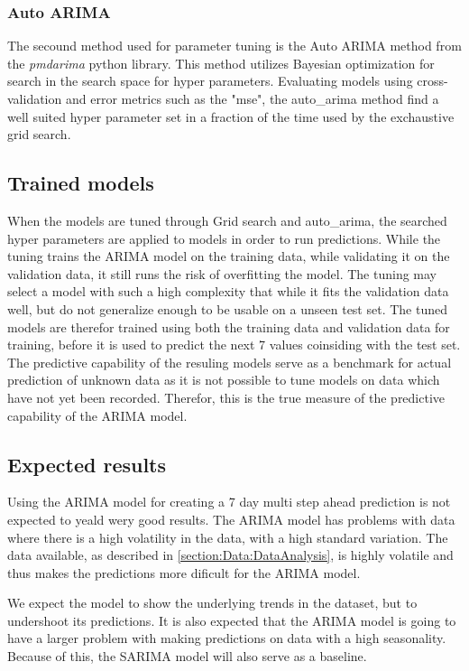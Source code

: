 \subsubsection{Auto ARIMA}
The secound method used for parameter tuning is the Auto ARIMA method from the \textit{pmdarima} python library.
This method utilizes Bayesian optimization for search in the search space for hyper parameters.
Evaluating models using cross-validation and error metrics such as the "mse",
the auto_arima method find a well suited hyper parameter set in a fraction of the time used by the exchaustive grid search.

\subsection{Trained models}
When the models are tuned through Grid search and auto_arima,
the searched hyper parameters are applied to models in order to run predictions.
While the tuning trains the ARIMA model on the training data, while validating it on the validation data,
it still runs the risk of overfitting the model.
The tuning may select a model with such a high complexity that while it fits the validation data well,
but do not generalize enough to be usable on a unseen test set.
The tuned models are therefor trained using both the training data and validation data for training,
before it is used to predict the next 7 values coinsiding with the test set.
The predictive capability of the resuling models serve as a benchmark for actual prediction
of unknown data as it is not possible to tune models on data which have not yet been recorded.
Therefor, this is the true measure of the predictive capability of the ARIMA model.

\subsection{Expected results}

Using the ARIMA model for creating a 7 day multi step ahead prediction is not expected to yeald wery good results.
The ARIMA model has problems with data where there is a high volatility in the data, with a high standard variation.
The data available, as described in \cref{section:Data:DataAnalysis},
is highly volatile and thus makes the predictions more dificult for the ARIMA model.

We expect the model to show the underlying trends in the dataset, but to
undershoot its predictions.
It is also expected that the ARIMA model is going to have a larger problem with making predictions on data with a high seasonality.
Because of this, the SARIMA model will also serve as a baseline.


